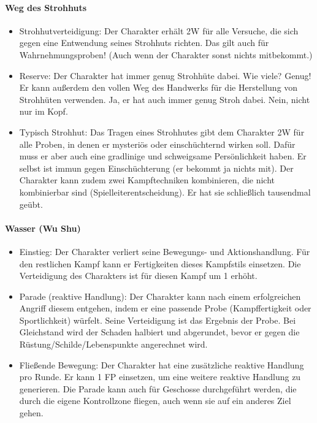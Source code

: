 \documentclass{article}
\begin{document}
\paragraph{Weg des Strohhuts}

\begin{itemize}
\item Strohhutverteidigung: Der Charakter erhält 2W für alle Versuche, die sich gegen eine Entwendung seines Strohhuts richten. Das gilt auch für Wahrnehmungsproben! (Auch wenn der Charakter sonst nichts mitbekommt.)
\item Reserve: Der Charakter hat immer genug Strohhüte dabei. Wie viele? Genug! Er kann außerdem den vollen Weg des Handwerks für die Herstellung von Strohhüten verwenden. Ja, er hat auch immer genug Stroh dabei. Nein, nicht nur im Kopf.
\item Typisch Strohhut: Das Tragen eines Strohhutes gibt dem Charakter 2W für alle Proben, in denen er mysteriös oder einschüchternd wirken soll. Dafür muss er aber auch eine gradlinige und schweigsame Persönlichkeit haben. Er selbst ist immun gegen Einschüchterung (er bekommt ja nichts mit). Der Charakter kann zudem zwei Kampftechniken kombinieren, die nicht kombinierbar sind (Spielleiterentscheidung). Er hat sie schließlich tausendmal geübt.
\end{itemize}

\paragraph{Wasser (Wu Shu)}

\begin{itemize}
\item Einstieg: Der Charakter verliert seine Bewegungs- und Aktionshandlung. Für den restlichen Kampf kann er Fertigkeiten dieses Kampfstils einsetzen. Die Verteidigung des Charakters ist für diesen Kampf um 1 erhöht.
\item Parade (reaktive Handlung): Der Charakter kann nach einem erfolgreichen Angriff diesem entgehen, indem er eine passende Probe (Kampffertigkeit oder Sportlichkeit) würfelt. Seine Verteidigung ist das Ergebnis der Probe. Bei Gleichstand wird der Schaden halbiert und abgerundet, bevor er gegen die Rüstung/Schilde/Lebenspunkte angerechnet wird.
\item Fließende Bewegung: Der Charakter hat eine zusätzliche reaktive Handlung pro Runde. Er kann 1 FP einsetzen, um eine weitere reaktive Handlung zu generieren. Die Parade kann auch für Geschosse durchgeführt werden, die durch die eigene Kontrollzone fliegen, auch wenn sie auf ein anderes Ziel gehen.
\end{itemize}
\end{document}
